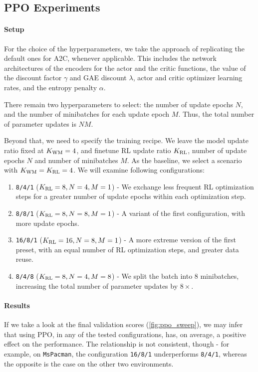 \documentclass[en]{pracamgr}
\newcommand{\env}[1]{{\tt #1}}
\begin{document}
\subsection{PPO Experiments}

\paragraph{Setup}  For the choice of the hyperparameters, we take the approach of replicating the default ones for A2C, whenever applicable. This includes the network architectures of the encoders for the actor and the critic functions, the value of the discount factor $\gamma$ and GAE discount $\lambda$, actor and critic optimizer learning rates, and the entropy penalty $\alpha$.

There remain two hyperparameters to select: the number of update epochs $N$, and the number of minibatches for each update epoch $M$. Thus, the total number of parameter updates is $NM$.

Beyond that, we need to specify the training recipe. We leave the model update ratio fixed at $K_{\rm WM} = 4$, and finetune RL update ratio $K_{\rm RL}$, number of update epochs $N$ and number of minibatches $M$. As the baseline, we select a scenario with $K_{\rm WM} = K_{\rm RL} = 4$. We will examine following configurations:

\begin{enumerate}
  \item {\tt 8/4/1} ($K_{\rm RL} = 8, N = 4, M = 1$) - We exchange less frequent RL optimization steps for a greater number of update epochs within each optimization step.
  \item {\tt 8/8/1} ($K_{\rm RL} = 8, N = 8, M = 1$) - A variant of the first configuration, with more update epochs.
  \item {\tt 16/8/1} ($K_{\rm RL} = 16, N = 8, M = 1$) - A more extreme version of the first preset, with an equal number of RL optimization steps, and greater data reuse.
  \item {\tt 8/4/8} ($K_{\rm RL} = 8, N = 4, M = 8$) - We split the batch into $8$ minibatches, increasing the total number of parameter updates by $8 \times$.
\end{enumerate}

\paragraph{Results} If we take a look at the final validation scores (\autoref{fig:ppo_sweep}), we may infer that using PPO, in any of the tested configurations, has, on average, a positive effect on the performance. The relationship is not consistent, though - for example, on \env{MsPacman}, the configuration {\tt 16/8/1} underperforms {\tt 8/4/1}, whereas the opposite is the case on the other two environments.
\end{document}
